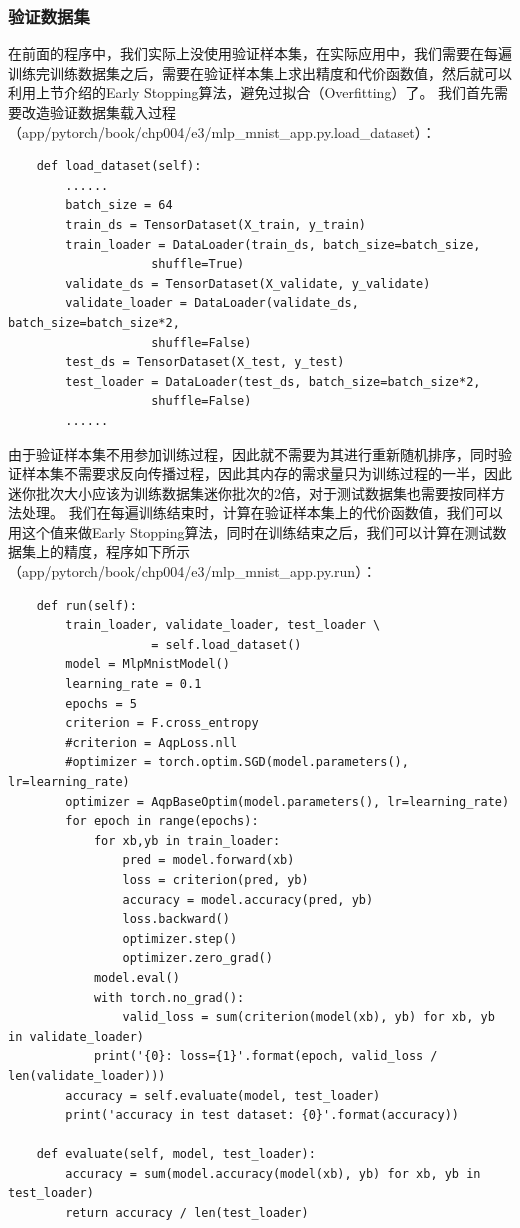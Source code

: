 \documentclass[UTF8]{article}
\begin{document}
\subsubsection{验证数据集}
在前面的程序中，我们实际上没使用验证样本集，在实际应用中，我们需要在每遍训练完训练数据集之后，需要在验证样本集上求出精度和代价函数值，然后就可以利用上节介绍的Early Stopping算法，避免过拟合（Overfitting）了。\newline
我们首先需要改造验证数据集载入过程（app/pytorch/book/chp004/e3/mlp\_mnist\_app.py.load\_dataset）：
\begin{lstlisting}
    def load_dataset(self):
    	......
        batch_size = 64
        train_ds = TensorDataset(X_train, y_train)
        train_loader = DataLoader(train_ds, batch_size=batch_size, 
                    shuffle=True)
        validate_ds = TensorDataset(X_validate, y_validate)
        validate_loader = DataLoader(validate_ds, batch_size=batch_size*2, 
                    shuffle=False)
        test_ds = TensorDataset(X_test, y_test)
        test_loader = DataLoader(test_ds, batch_size=batch_size*2, 
                    shuffle=False)
        ......
\end{lstlisting}
由于验证样本集不用参加训练过程，因此就不需要为其进行重新随机排序，同时验证样本集不需要求反向传播过程，因此其内存的需求量只为训练过程的一半，因此迷你批次大小应该为训练数据集迷你批次的2倍，对于测试数据集也需要按同样方法处理。\newline
我们在每遍训练结束时，计算在验证样本集上的代价函数值，我们可以用这个值来做Early Stopping算法，同时在训练结束之后，我们可以计算在测试数据集上的精度，程序如下所示（app/pytorch/book/chp004/e3/mlp\_mnist\_app.py.run）：
\begin{lstlisting}
    def run(self):
        train_loader, validate_loader, test_loader \
                    = self.load_dataset()
        model = MlpMnistModel()
        learning_rate = 0.1
        epochs = 5
        criterion = F.cross_entropy
        #criterion = AqpLoss.nll
        #optimizer = torch.optim.SGD(model.parameters(), lr=learning_rate)
        optimizer = AqpBaseOptim(model.parameters(), lr=learning_rate)
        for epoch in range(epochs):
            for xb,yb in train_loader:
                pred = model.forward(xb)
                loss = criterion(pred, yb)
                accuracy = model.accuracy(pred, yb)
                loss.backward()
                optimizer.step()
                optimizer.zero_grad()
            model.eval()
            with torch.no_grad():
                valid_loss = sum(criterion(model(xb), yb) for xb, yb in validate_loader)
            print('{0}: loss={1}'.format(epoch, valid_loss / len(validate_loader)))
        accuracy = self.evaluate(model, test_loader)
        print('accuracy in test dataset: {0}'.format(accuracy))

    def evaluate(self, model, test_loader):
        accuracy = sum(model.accuracy(model(xb), yb) for xb, yb in test_loader)
        return accuracy / len(test_loader)
\end{lstlisting}
\end{document}
